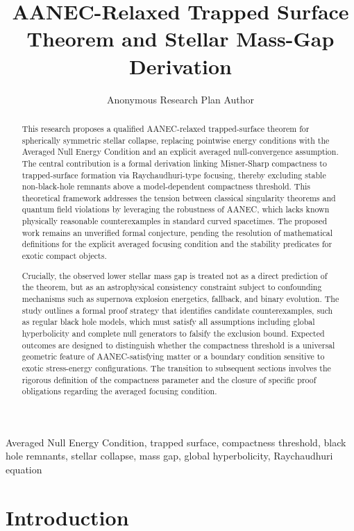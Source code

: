 \documentclass[conference]{IEEEtran}
\begin{document}
\title{AANEC-Relaxed Trapped Surface Theorem and Stellar Mass-Gap Derivation}\author{Anonymous Research Plan Author}\maketitle

\begin{abstract}
This research proposes a qualified AANEC-relaxed trapped-surface theorem for spherically symmetric stellar collapse, replacing pointwise energy conditions with the Averaged Null Energy Condition and an explicit averaged null-convergence assumption. The central contribution is a formal derivation linking Misner-Sharp compactness to trapped-surface formation via Raychaudhuri-type focusing, thereby excluding stable non-black-hole remnants above a model-dependent compactness threshold. This theoretical framework addresses the tension between classical singularity theorems and quantum field violations by leveraging the robustness of AANEC, which lacks known physically reasonable counterexamples in standard curved spacetimes. The proposed work remains an unverified formal conjecture, pending the resolution of mathematical definitions for the explicit averaged focusing condition and the stability predicates for exotic compact objects.

Crucially, the observed lower stellar mass gap is treated not as a direct prediction of the theorem, but as an astrophysical consistency constraint subject to confounding mechanisms such as supernova explosion energetics, fallback, and binary evolution. The study outlines a formal proof strategy that identifies candidate counterexamples, such as regular black hole models, which must satisfy all assumptions including global hyperbolicity and complete null generators to falsify the exclusion bound. Expected outcomes are designed to distinguish whether the compactness threshold is a universal geometric feature of AANEC-satisfying matter or a boundary condition sensitive to exotic stress-energy configurations. The transition to subsequent sections involves the rigorous definition of the compactness parameter and the closure of specific proof obligations regarding the averaged focusing condition.
\end{abstract}
\begin{IEEEkeywords}
Averaged Null Energy Condition, trapped surface, compactness threshold, black hole remnants, stellar collapse, mass gap, global hyperbolicity, Raychaudhuri equation
\end{IEEEkeywords}\section{Introduction}
\end{document}

